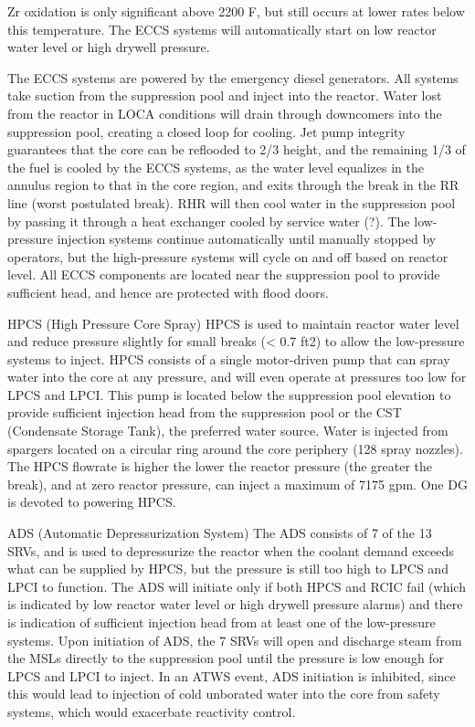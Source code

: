 \documentclass[10pt]{article}
\begin{document}
Zr oxidation is only significant above 2200 F, but still occurs at lower rates below this temperature. The ECCS systems will automatically start on low reactor water level or high drywell pressure. 

The ECCS systems are powered by the emergency diesel generators. All systems take suction from the suppression pool and inject into the reactor. Water lost from the reactor in LOCA conditions will drain through downcomers into the suppression pool, creating a closed loop for cooling. Jet pump integrity guarantees that the core can be reflooded to 2/3 height, and the remaining 1/3 of the fuel is cooled by the ECCS systems, as the water level equalizes in the annulus region to that in the core region, and exits through the break in the RR line (worst postulated break). RHR will then cool water in the suppression pool by passing it through a heat exchanger cooled by service water (?). The low-pressure injection systems continue automatically until manually stopped by operators, but the high-pressure systems will cycle on and off based on reactor level. All ECCS components are located near the suppression pool to provide sufficient head, and hence are protected with flood doors. 

HPCS (High Pressure Core Spray)
HPCS is used to maintain reactor water level and reduce pressure slightly for small breaks (< 0.7 ft2) to allow the low-pressure systems to inject. HPCS consists of a single motor-driven pump that can spray water into the core at any pressure, and will even operate at pressures too low for LPCS and LPCI. This pump is located below the suppression pool elevation to provide sufficient injection head from the suppression pool  or the CST (Condensate Storage Tank), the preferred water source. Water is injected from spargers located on a circular ring around the core periphery (128 spray nozzles). The HPCS flowrate is higher the lower the reactor pressure (the greater the break), and at zero reactor pressure, can inject a maximum of 7175 gpm. One DG is devoted to powering HPCS. 

ADS (Automatic Depressurization System)
The ADS consists of 7 of the 13 SRVs, and is used to depressurize the reactor when the coolant demand exceeds what can be supplied by HPCS, but the pressure is still too high to LPCS and LPCI to function. The ADS will initiate only if both HPCS and RCIC fail (which is indicated by low reactor water level or high drywell pressure alarms) and there is indication of sufficient injection head from at least one of the low-pressure systems. Upon initiation of ADS, the 7 SRVs will open and discharge steam from the MSLs directly to the suppression pool until the pressure is low enough for LPCS and LPCI to inject.  In an ATWS event, ADS initiation is inhibited, since this would lead to injection of cold unborated water into the core from safety systems, which would exacerbate reactivity control. 
\end{document}
